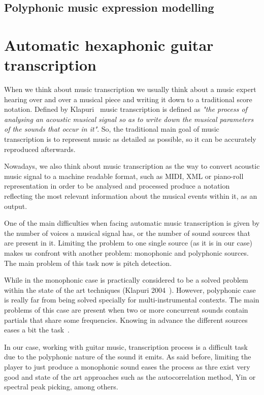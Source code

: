 \subsection{Polyphonic music expression modelling}
\label{sec:polymuexpmod}

\section{Automatic hexaphonic guitar transcription}
\label{sec:autohexaguit}
When we think about music transcription we usually think about a music expert hearing over and over a musical piece and writing it down to a traditional score notation. Defined by Klapuri~\cite{Klapuri2004} music transcription is defined as \textit{"the process of analysing an acoustic musical signal so as to write down the musical parameters of the sounds that occur in it"}. So, the traditional main goal of music transcription is to represent music as detailed as possible, so it can be accurately reproduced afterwards. 

Nowadays, we also think about music transcription as the way to convert acoustic music signal to a machine readable format, such as MIDI, XML or piano-roll representation in order to be analysed and processed produce a notation reflecting the most relevant information about the musical events within it, as an output. 	

One of the main difficulties when facing automatic music transcription is given by the number of voices a musical signal has, or the number of sound sources that are present in it. Limiting the problem to one single source (as it is in our case) makes us confront with another problem: monophonic and polyphonic sources. The main problem of this task now is pitch detection. 

While in the monophonic case is practically considered to be a solved problem within the state of the art techniques (Klapuri 2004~\cite{Klapuri2004}). However, polyphonic case is really far from being solved specially for multi-instrumental contexts. The main problems of this case are present when two or more concurrent sounds contain partials that share some frequencies. Knowing in advance the different sources eases a bit the task~\cite{argenti2011}. 

In our case, working with guitar music, transcription process is a difficult task due to the polyphonic nature of the sound it emits.
As said before, limiting the player to just produce a monophonic sound eases the process as thre exist very good and state of the art approaches such as the autocorrelation method, Yin or spectral peak picking, among others.

